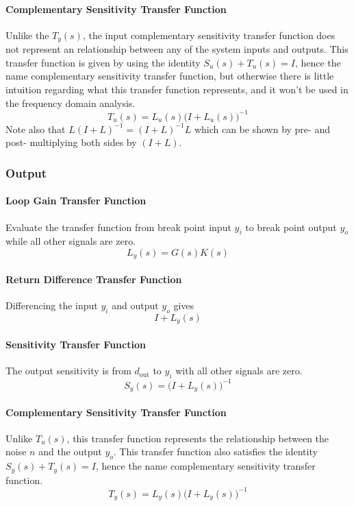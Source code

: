 \paragraph{Complementary Sensitivity Transfer Function}
Unlike the $T_{y}(s)$, the input complementary sensitivity transfer function does not represent an relationship between any of the system inputs and outputs.
This transfer function is given by using the identity $S_{u}(s)+T_{u}(s)=I$, hence the name complementary sensitivity transfer function, but otherwise there is little intuition regarding what this transfer function represents, and it won't be used in the frequency domain analysis.
\begin{equation}
  T_{u}(s)=L_{u}(s)\bigr(I+L_{u}(s)\bigr)^{-1}
\end{equation}
Note also that $L(I+L)^{-1}=(I+L)^{-1}L$ which can be shown by pre- and post- multiplying both sides by $(I+L)$.

\subsubsection{Output}
\paragraph{Loop Gain Transfer Function}
Evaluate the transfer function from break point input $y_{i}$ to break point output $y_{o}$ while all other signals are zero.
\begin{equation}
  L_{y}(s)=G(s)K(s)
\end{equation}

\paragraph{Return Difference Transfer Function}
Differencing the input $y_{i}$ and output $y_{o}$ gives
\begin{equation}
  I+L_{y}(s)
\end{equation}

\paragraph{Sensitivity Transfer Function}
The output sensitivity is from $d_{\text{out}}$ to $y_{i}$ with all other signals are zero.
\begin{equation}
  S_{y}(s)=\bigr(I+L_{y}(s)\bigr)^{-1}
\end{equation}

\paragraph{Complementary Sensitivity Transfer Function}
Unlike $T_{u}(s)$, this transfer function represents the relationship between the noise $n$ and the output $y_{o}$.
This transfer function also satisfies the identity $S_{y}(s)+T_{y}(s)=I$, hence the name complementary sensitivity transfer function.
\begin{equation}
  T_{y}(s)=L_{y}(s)\bigr(I+L_{y}(s)\bigr)^{-1}
\end{equation}

